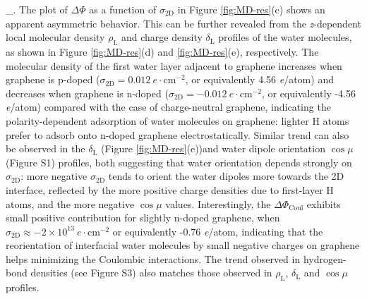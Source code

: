 \documentclass[journal=jacsat,manuscript=article,email=true,hyperref=true,keywords=true]{achemso}
\begin{document}
\Phi_{}\).  The plot of \(\Delta \Phi\) as a function of
\(\sigma_{\mathrm{2D}}\) in Figure \ref{fig:MD-res}(c) shows an apparent
asymmetric behavior. This can be further revealed from the
\emph{z}-dependent local molecular density \(\rho_{\mathrm{L}}\) and charge
density \(\delta_{\mathrm{L}}\) profiles of the water molecules, as
shown in Figure \ref{fig:MD-res}(d) and \ref{fig:MD-res}(e),
respectively. The molecular density of the first water layer adjacent
to graphene increases when graphene is p-doped
(\(\sigma_{\mathrm{2D}}=0.012\ e\cdot \mathrm{cm}^{-2}\), or
equivalently 4.56 \textit{e}/atom) and decreases when graphene is
n-doped (\(\sigma_{\mathrm{2D}}=-0.012\ e\cdot \mathrm{cm}^{-2}\), or
equivalently -4.56 \textit{e}/atom) compared with the case of
charge-neutral graphene, indicating the polarity-dependent adsorption
of water molecules on graphene: lighter H atoms prefer to adsorb onto
n-doped graphene electrostatically. Similar trend can also be observed
in the \(\delta_{\mathrm{L}}\) (Figure \ref{fig:MD-res}(e))and water
dipole orientation \(\cos \mu\) (Figure S1) profiles, both
suggesting that water orientation depends strongly on
\(\sigma_{\mathrm{2D}}\): more negative \(\sigma_{\mathrm{2D}}\) tends
to orient the water dipoles more towards the 2D interface, reflected
by the more positive charge densities due to first-layer H atoms, and
the more negative \(\cos \mu\) values. Interestingly, the \(\Delta
\Phi_{\mathrm{Coul}}\) exhibits small positive contribution for slightly
n-doped graphene, when \(\sigma_{\mathrm{2D}} \approx -2\times10^{13}\
e\cdot \mathrm{cm}^{-2}\) or equivalently -0.76 \textit{e}/atom,
indicating that the reorientation of interfacial water molecules by
small negative charges on graphene helps minimizing the Coulombic
interactions. The trend observed in hydrogen-bond densities (see
Figure S3) also matches those observed in \(\rho_{\mathrm{L}}\),
\(\delta_{\mathrm{L}}\) and \(\cos \mu\) profiles.
\end{document}
